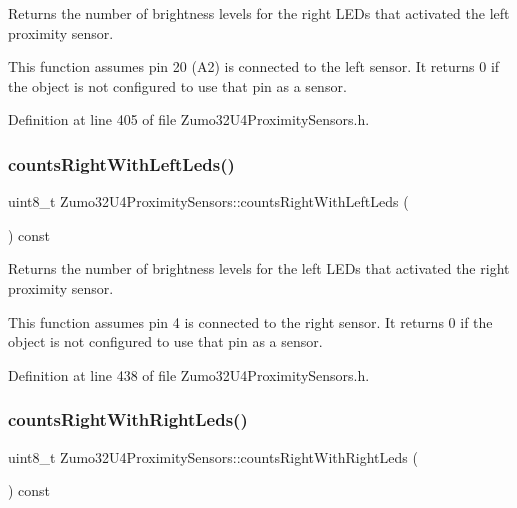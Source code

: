 Returns the number of brightness levels for the right L\+E\+Ds that activated the left proximity sensor. 

This function assumes pin 20 (A2) is connected to the left sensor. It returns 0 if the object is not configured to use that pin as a sensor. 

Definition at line 405 of file Zumo32\+U4\+Proximity\+Sensors.\+h.

\mbox{\label{class_zumo32_u4_proximity_sensors_aa804ac099f3f141b60644accdb94c737}} 
\subsubsection{\texorpdfstring{counts\+Right\+With\+Left\+Leds()}{countsRightWithLeftLeds()}}
{\footnotesize\ttfamily uint8\+\_\+t Zumo32\+U4\+Proximity\+Sensors\+::counts\+Right\+With\+Left\+Leds (\begin{DoxyParamCaption}{ }\end{DoxyParamCaption}) const\hspace{0.3cm}{\ttfamily [inline]}}



Returns the number of brightness levels for the left L\+E\+Ds that activated the right proximity sensor. 

This function assumes pin 4 is connected to the right sensor. It returns 0 if the object is not configured to use that pin as a sensor. 

Definition at line 438 of file Zumo32\+U4\+Proximity\+Sensors.\+h.

\mbox{\label{class_zumo32_u4_proximity_sensors_a2b2b38429cdd297068a2b0addf1c54d7}} 
\subsubsection{\texorpdfstring{counts\+Right\+With\+Right\+Leds()}{countsRightWithRightLeds()}}
{\footnotesize\ttfamily uint8\+\_\+t Zumo32\+U4\+Proximity\+Sensors\+::counts\+Right\+With\+Right\+Leds (\begin{DoxyParamCaption}{ }\end{DoxyParamCaption}) const\hspace{0.3cm}{\ttfamily [inline]}}



